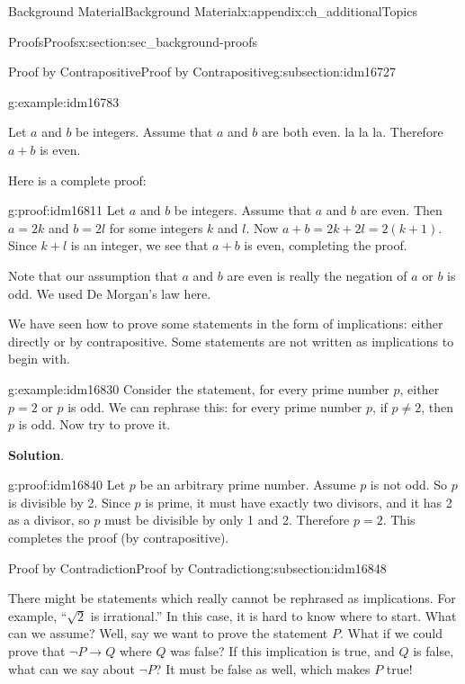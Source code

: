 \documentclass[oneside,10pt,]{book}
\numberwithin{equation}{chapter}
\def\imp{\rightarrow}
\begin{document}
\begin{appendixptx}{Background Material}{}{Background Material}{}{}{x:appendix:ch_additionalTopics}
\begin{sectionptx}{Proofs}{}{Proofs}{}{}{x:section:sec_background-proofs}
\begin{subsectionptx}{Proof by Contrapositive}{}{Proof by Contrapositive}{}{}{g:subsection:idm16727}
\begin{example}{}{g:example:idm16783}
\par
Let \(a\) and \(b\) be integers. Assume that \(a\) and \(b\) are both even. la la la. Therefore \(a+b\) is even.%
\par
Here is a complete proof:%
\begin{proofptx}{}{g:proof:idm16811}
Let \(a\) and \(b\) be integers. Assume that \(a\) and \(b\) are even. Then \(a = 2k\) and \(b = 2l\) for some integers \(k\) and \(l\). Now \(a + b = 2k + 2l = 2(k+1)\). Since \(k + l\) is an integer, we see that \(a + b\) is even, completing the proof.%
\end{proofptx}
Note that our assumption that \(a\) and \(b\) are even is really the negation of \(a\) or \(b\) is odd. We used De Morgan's law here.%
\end{example}
We have seen how to prove some statements in the form of implications: either directly or by contrapositive. Some statements are not written as implications to begin with.%
\begin{example}{}{g:example:idm16830}%
Consider the statement, for every prime number \(p\), either \(p = 2\) or \(p\) is odd. We can rephrase this: for every prime number \(p\), if \(p \ne 2\), then \(p\) is odd. Now try to prove it.%
\par\smallskip%
\noindent\textbf{Solution}.\hypertarget{g:solution:idm16839}{}\quad{}\begin{proofptx}{}{g:proof:idm16840}
Let \(p\) be an arbitrary prime number. Assume \(p\) is not odd. So \(p\) is divisible by 2. Since \(p\) is prime, it must have exactly two divisors, and it has 2 as a divisor, so \(p\) must be divisible by only 1 and 2. Therefore \(p = 2\). This completes the proof (by contrapositive).%
\end{proofptx}
\end{example}
\end{subsectionptx}
%
%
\typeout{************************************************}
\typeout{************************************************}
%
\begin{subsectionptx}{Proof by Contradiction}{}{Proof by Contradiction}{}{}{g:subsection:idm16848}
%
\par
There might be statements which really cannot be rephrased as implications. For example, ``\(\sqrt 2\) is irrational.'' In this case, it is hard to know where to start. What can we assume? Well, say we want to prove the statement \(P\). What if we could prove that \(\neg P \imp Q\) where \(Q\) was false? If this implication is true, and \(Q\) is false, what can we say about \(\neg P\)? It must be false as well, which makes \(P\) true!%

\end{subsectionptx}
\end{sectionptx}
\end{appendixptx}
\end{document}
